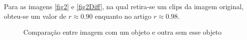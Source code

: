 \documentclass[10pt,a4paper]{article}
\begin{document}
Para as imagens \ref{fig2} e \ref{fig2Diff}, na qual retira-se um
clips da imagem original, obteu-se um valor de $r\approx 0.90$
enquanto no artigo $r\approx 0.98$.

\begin{figure}[h!]
\begin{center}
\hspace{10mm}
\caption{Comparação entre imagem com um objeto e outra sem esse objeto
 }
\end{center}
\end{figure}
\end{document}
